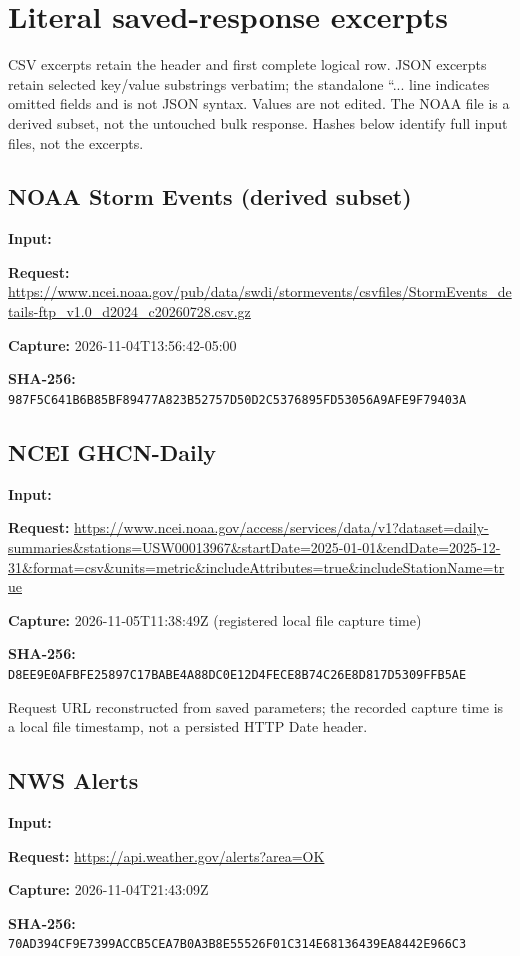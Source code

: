 \section{Literal saved-response excerpts}
CSV excerpts retain the header and first complete logical row. JSON excerpts retain selected key/value substrings verbatim; the standalone ``... line indicates omitted fields and is not JSON syntax. Values are not edited. The NOAA file is a derived subset, not the untouched bulk response. Hashes below identify full input files, not the excerpts.
\subsection{NOAA Storm Events (derived subset)}
\textbf{Input:} \par
\textbf{Request:} \url{https://www.ncei.noaa.gov/pub/data/swdi/stormevents/csvfiles/StormEvents_details-ftp_v1.0_d2024_c20260728.csv.gz}\par
\textbf{Capture:} 2026-11-04T13:56:42-05:00\par
\textbf{SHA-256:} \nolinkurl{987F5C641B6B85BF89477A823B52757D50D2C5376895FD53056A9AFE9F79403A}\par

\subsection{NCEI GHCN-Daily}
\textbf{Input:} \par
\textbf{Request:} \url{https://www.ncei.noaa.gov/access/services/data/v1?dataset=daily-summaries&stations=USW00013967&startDate=2025-01-01&endDate=2025-12-31&format=csv&units=metric&includeAttributes=true&includeStationName=true}\par
\textbf{Capture:} 2026-11-05T11:38:49Z (registered local file capture time)\par
\textbf{SHA-256:} \nolinkurl{D8EE9E0AFBFE25897C17BABE4A88DC0E12D4FECE8B74C26E8D817D5309FFB5AE}\par

Request URL reconstructed from saved parameters; the recorded capture time is a local file timestamp, not a persisted HTTP Date header.
\subsection{NWS Alerts}
\textbf{Input:} \par
\textbf{Request:} \url{https://api.weather.gov/alerts?area=OK}\par
\textbf{Capture:} 2026-11-04T21:43:09Z\par
\textbf{SHA-256:} \nolinkurl{70AD394CF9E7399ACCB5CEA7B0A3B8E55526F01C314E68136439EA8442E966C3}\par

